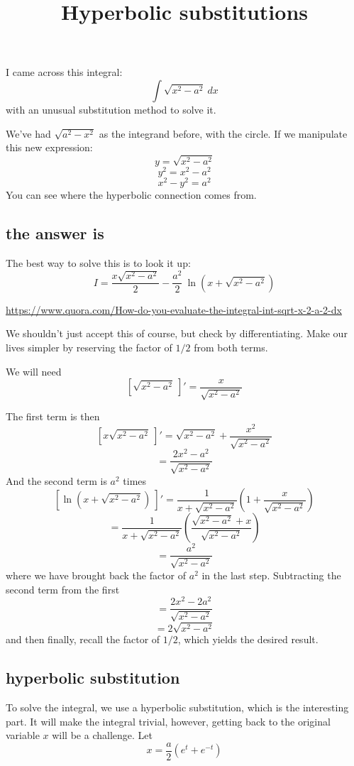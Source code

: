 \documentclass[11pt, oneside]{article}
\title{Hyperbolic substitutions}
\date{}
\begin{document}
\maketitle
\Large


I came across this integral:
\[ \int \sqrt{x^2 - a^2} \ dx \]
with an unusual substitution method to solve it.

We've had $\sqrt{a^2 - x^2}$ as the integrand before, with the circle.  If we manipulate this new expression:
\[ y = \sqrt{x^2 - a^2} \]
\[ y^2 = x^2 - a^2 \]
\[ x^2 - y^2 = a^2 \]
You can see where the hyperbolic connection comes from.  

\subsection*{the answer is}
The best way to solve this is to look it up:
\[ I = \frac{x \sqrt{x^2-a^2}}{2} - \frac{a^2}{2} \ \ln(x + \sqrt{x^2 - a^2}) \]

\url{https://www.quora.com/How-do-you-evaluate-the-integral-int-sqrt-x-2-a-2-dx}

We shouldn't just accept this of course, but check by differentiating.  Make our lives simpler by reserving the factor of $1/2$ from both terms.

We will need
\[ [ \sqrt{x^2 - a^2} \ ]' = \frac{x}{\sqrt{x^2-a^2}} \]

The first term is then
\[  [ x \sqrt{x^2-a^2} \ ]' =  \sqrt{x^2-a^2} + \frac{x^2}{\sqrt{x^2-a^2}} \]
\[ = \frac{2x^2 - a^2}{\sqrt{x^2-a^2}} \]
And the second term is $a^2$ times
\[  [ \ln(x + \sqrt{x^2 - a^2}) \ ]' = \frac{1}{x + \sqrt{x^2 - a^2}} (1 +  \frac{x}{\sqrt{x^2-a^2}} ) \]
\[ = \frac{1}{x + \sqrt{x^2 - a^2}} (\frac{\sqrt{x^2-a^2} + x}{\sqrt{x^2-a^2}} ) \]
\[ = \frac{a^2}{\sqrt{x^2-a^2}} \]
where we have brought back the factor of $a^2$ in the last step.  Subtracting the second term from the first
\[ = \frac{2x^2 - 2a^2}{\sqrt{x^2-a^2}} \] 
\[ = 2 \sqrt{x^2-a^2} \]
and then finally, recall the factor of $1/2$, which yields the desired result.

\subsection*{hyperbolic substitution}
To solve the integral, we use a hyperbolic substitution, which is the interesting part.  It will make the integral trivial, however, getting back to the original variable $x$ will be a challenge.  Let
\[ x = \frac{a}{2} (e^t + e^{-t}) \]
\end{document}
